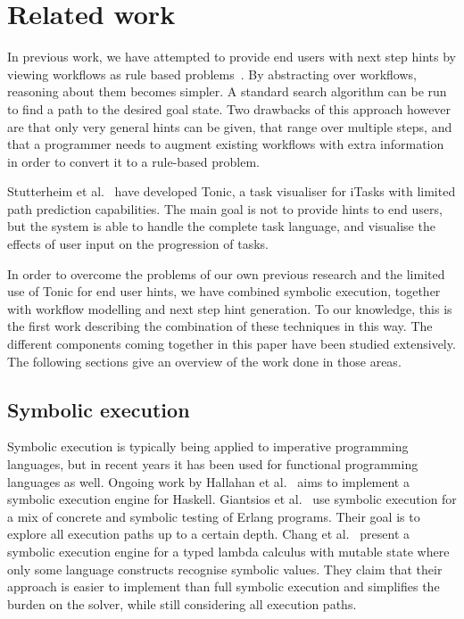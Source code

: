 
\section{Related work}
\label{sec:relatedwork}

In previous work, we have attempted to provide end users with next step hints by viewing workflows as rule based problems~\cite{DBLP:conf/sfp/NausJ16}.
By abstracting over workflows, reasoning about them becomes simpler.
A standard search algorithm can be run to find a path to the desired goal state.
Two drawbacks of this approach however are that only very general hints can be given, that range over multiple steps, and that a programmer needs to augment existing workflows with extra information in order to convert it to a rule-based problem.

Stutterheim et al.~\cite{DBLP:conf/sfp/StutterheimPA14} have developed Tonic, a task visualiser for iTasks with limited path prediction capabilities.
The main goal is not to provide hints to end users, but the system is able to handle the complete task language, and visualise the effects of user input on the progression of tasks.

In order to overcome the problems of our own previous research and the limited use of Tonic for end user hints, we have combined symbolic execution, together with workflow modelling and next step hint generation.
To our knowledge, this is the first work describing the combination of these techniques in this way.
The different components coming together in this paper have been studied extensively.
The following sections give an overview of the work done in those areas.


\subsection{Symbolic execution}

Symbolic execution \cite{King1975,Boyer1975} is typically being applied to imperative programming languages,
but in recent years it has been used for functional programming languages as well.
Ongoing work by Hallahan et al.~\cite{HallahanXP2017,DBLP:conf/pldi/HallahanXBJP19} aims to implement a symbolic execution engine for Haskell.
Giantsios et al.~\cite{GiantsiosPS2017} use symbolic execution for a mix of concrete and symbolic testing of Erlang programs.
Their goal is to explore all execution paths up to a certain depth.
Chang et al.~\cite{ChangKT2018} present a symbolic execution engine for a typed lambda calculus with mutable state where only some language constructs recognise symbolic values.
They claim that their approach is easier to implement than full symbolic execution and simplifies the burden on the solver, while still considering all execution paths.


